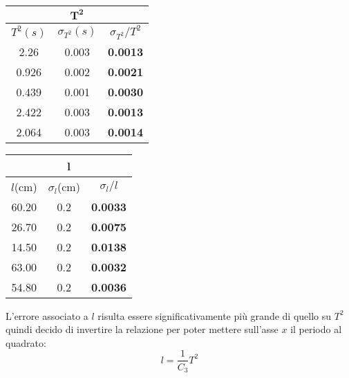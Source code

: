 \documentclass{article}
\begin{document}
	\begin{minipage}{0.5\textwidth}
		\begin{table}[H]
			\centering
			\begin{tabular}{@{}ccc@{}}
				\multicolumn{3}{c}{$\mathbf{T^2}$} \\ \midrule
				$T^2(s)$ & $\sigma_{T^2} (s)$ & $\sigma_{T^2} / T^2$ \\ \midrule
				2.26 & 0.003 & \textbf{0.0013 }\\
				0.926 & 0.002 & \textbf{0.0021} \\
				0.439 & 0.001 & \textbf{0.0030} \\
				2.422 & 0.003 & \textbf{0.0013} \\
				2.064 & 0.003 & \textbf{0.0014}  \\ \bottomrule   
			\end{tabular}
		\end{table}
	\end{minipage}
	\begin{minipage}{0.5\textwidth}
		\begin{table}[H]
			\centering
			\begin{tabular}{@{}ccc@{}}
				\multicolumn{3}{c}{\textbf{l}} \\ \midrule
				$l$(cm) & $\sigma_l$(cm) & $\sigma_l / l$ \\ \midrule
				60.20 & 0.2 & \textbf{0.0033} \\
				26.70 & 0.2 & \textbf{0.0075} \\
				14.50 & 0.2 & \textbf{0.0138} \\
				63.00 & 0.2 & \textbf{0.0032} \\
				54.80 & 0.2 & \textbf{0.0036} \\ \bottomrule  
			\end{tabular}
		\end{table}
	\end{minipage}
	\vspace{1cm}
	
	\noindent
	L'errore associato a $l$ risulta essere significativamente più grande di quello su $T^2$ quindi decido di invertire la relazione per poter mettere sull'asse $x$ il periodo al quadrato:
	\[
	l = \frac{1}{C_3} T^2
	\]
	
\end{document}
